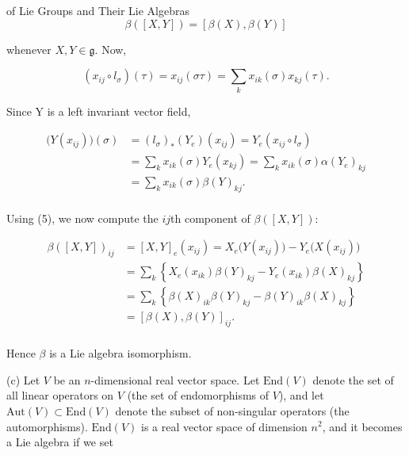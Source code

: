 \begin{examples}{of Lie Groups and Their Lie Algebras}
\begin{equation}
\tag{3}\label{eq:3.10:3}
\beta([X,Y])=[\beta(X),\beta(Y)]
\end{equation}

whenever $X, Y \in \mathfrak{g}$. Now,

\begin{equation}
\tag{4}\label{eq:3.10:4}
(x_{i j}\circ l_{\sigma})(\tau)=x_{i j}(\sigma\tau)=\sum_{k}x_{i k}(\sigma)x_{k j}(\tau).
\end{equation}

Since Y is a left invariant vector field,

\begin{equation}
\tag{5}\label{eq:3.10:5}
\begin{aligned}{\big(Y(x_{i j})\big)(\sigma)}&{{}=(l_{\sigma})_{*}(Y_{e})(x_{i j})=Y_{e}(x_{i j}\circ l_{\sigma})}\\ {}&{{}=\sum_{k}x_{i k}(\sigma)Y_{e}(x_{k j})=\sum_{k}x_{i k}(\sigma)\alpha(Y_{e})_{k j}}\\ {}&{{}=\sum_{k}x_{i k}(\sigma)\beta(Y)_{k j}.}\\ \end{aligned}
\end{equation}

Using (5), we now compute the  $ij$th component of  $ \beta([X,Y]) $:

\begin{equation}
\tag{6}\label{eq:3.10:6}
\begin{aligned}{\beta([X,Y])_{i j}}&{{}=[X,Y]_{e}(x_{i j})=X_{e}\big(Y(x_{i j})\big)-Y_{e}\big(X(x_{i j})\big)}\\ {}&{{}=\sum_{k}\left\{X_{e}(x_{i k})\beta(Y)_{k j}-Y_{e}(x_{i k})\beta(X)_{k j}\right\}}\\ {}&{{}=\sum_{k}\left\{\beta(X)_{i k}\beta(Y)_{k j}-\beta(Y)_{i k}\beta(X)_{k j}\right\}}\\ {}&{{}=[\beta(X),\beta(Y)]_{i j}.}\\ \end{aligned}
\end{equation}

Hence $\beta$ is a Lie algebra isomorphism.

(c) Let $V$ be an $n$-dimensional real vector space. Let $\mathrm{End}(V)$ denote the set of all linear operators on $V$ (the set of endomorphisms of $V$), and let $\mathrm{Aut}(V) \subset \mathrm{End}(V)$ denote the subset of non-singular operators (the automorphisms). $\mathrm{End}(V)$ is a real vector space of dimension $n^{2}$, and it becomes a Lie algebra if we set


\end{examples}
